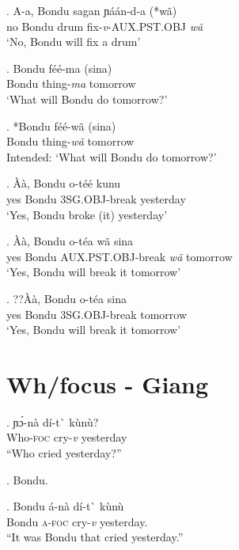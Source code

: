 \documentclass{assets/fieldnotes}
\begin{document}
\exg. A-a, Bondu sagan ɲáán-d-a (*wã)\\
no Bondu drum fix-\textit{v}-AUX.PST.OBJ \textit{wã}\\
`No, Bondu will fix a drum'\\

\exg. Bondu féé-ma (sina)\\
Bondu thing-\textit{ma} tomorrow\\
`What will Bondu do tomorrow?'

\exg. *Bondu féé-wã (sina)\\
Bondu thing-\textit{wã} tomorrow\\
Intended: `What will Bondu do tomorrow?'\\

\exg. Àà, Bondu o-téé kunu\\
yes Bondu 3SG.OBJ-break yesterday\\
`Yes, Bondu broke (it) yesterday'\\

\exg. Àà, Bondu o-téa wã sina\\
yes Bondu AUX.PST.OBJ-break \textit{wã} tomorrow\\
`Yes, Bondu will break it tomorrow'

\exg. ??Àà, Bondu o-téa sina\\
yes Bondu 3SG.OBJ-break tomorrow\\
`Yes, Bondu will break it tomorrow'\\


\section{Wh/focus - Giang}

\exg. ɲɔ́-nà dí-t\`{} kùnù?\\
Who-\textsc{foc} cry-\textit{v} yesterday\\
``Who cried yesterday?''

\ex. Bondu.

\exg. Bondu á-nà dí-t\`{} kùnù\\
Bondu \textsc{a-foc} cry-\textit{v} yesterday.\\
``It was Bondu that cried yesterday.'' 
\end{document}
